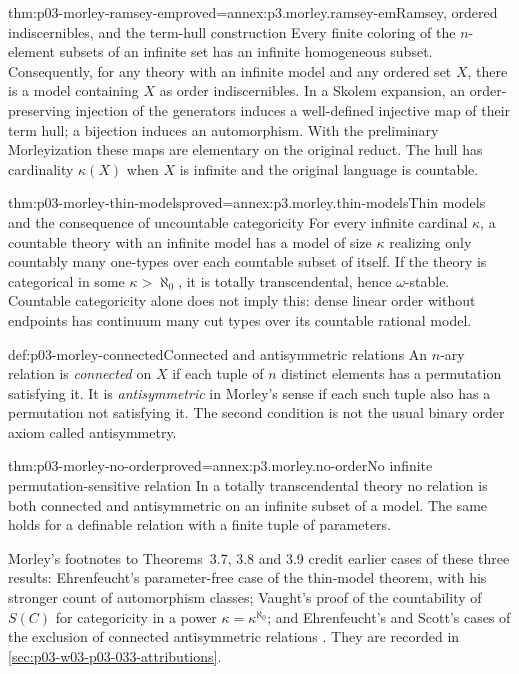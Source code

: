 \begin{hbtheorem}{thm:p03-morley-ramsey-em}{proved=annex:p3.morley.ramsey-em}{Ramsey, ordered indiscernibles, and the term-hull construction}
Every finite coloring of the \(n\)-element subsets of an infinite
set has an infinite homogeneous subset. Consequently, for any
theory with an infinite model and any ordered set \(X\), there is
a model containing \(X\) as order indiscernibles. In a Skolem
expansion, an order-preserving injection of the generators induces
a well-defined injective map of their term hull; a bijection induces
an automorphism. With the preliminary Morleyization these maps are
elementary on the original reduct. The hull has cardinality
\(\kappa(X)\) when \(X\) is infinite and the original
language is countable.
\end{hbtheorem}

\begin{hbtheorem}{thm:p03-morley-thin-models}{proved=annex:p3.morley.thin-models}{Thin models and the consequence of uncountable categoricity}
For every infinite cardinal \(\kappa\), a countable theory with
an infinite model has a model of size \(\kappa\) realizing only
countably many one-types over each countable subset of itself.
If the theory is categorical in some \(\kappa>\aleph_0\), it is
totally transcendental, hence \(\omega\)-stable.
Countable categoricity alone does not imply this: dense linear
order without endpoints has continuum many cut types over its
countable rational model.
\end{hbtheorem}

\begin{hbdefinition}{def:p03-morley-connected}{Connected and antisymmetric relations}
An \(n\)-ary relation is \emph{connected} on \(X\) if each
tuple of \(n\) distinct elements has a permutation satisfying it.
It is \emph{antisymmetric} in Morley's sense if each such tuple
also has a permutation not satisfying it. The second condition
is not the usual binary order axiom called antisymmetry.
\end{hbdefinition}

\begin{hbtheorem}{thm:p03-morley-no-order}{proved=annex:p3.morley.no-order}{No infinite permutation-sensitive relation}
In a totally transcendental theory no relation is both connected
and antisymmetric on an infinite subset of a model. The same holds
for a definable relation with a finite tuple of parameters.
\end{hbtheorem}

Morley's footnotes to Theorems~3.7, 3.8 and 3.9 credit earlier cases of
these three results: Ehrenfeucht's parameter-free case of the thin-model
theorem, with his stronger count of automorphism classes; Vaught's proof
of the countability of \(S(C)\) for categoricity in a power
\(\kappa=\kappa^{\aleph_0}\); and Ehrenfeucht's and Scott's cases of the
exclusion of connected antisymmetric relations
\cite[p.~528, nn.~16--18]{Morley1965}. They are recorded in
\cref{sec:p03-w03-p03-033-attributions}.

